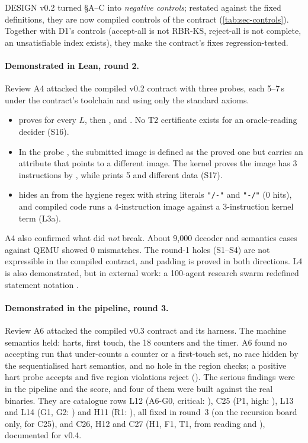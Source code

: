 DESIGN v0.2 turned §A--C into \emph{negative controls}; restated against the fixed definitions, they
are now compiled controls of the contract (\cref{tab:sec-controls}). Together with D1's controls
(accept-all is not RBR-KS, reject-all is not complete, an unsatisfiable index exists), they make the
contract's fixes regression-tested.

\paragraph{Demonstrated in Lean, round 2.} Review A4 attacked the compiled v0.2 contract with three
probes, each 5--7\,s under the contract's toolchain and using only the standard axioms.
\begin{itemize}[nosep]
\item {} proves  for every $L$, then ,
   and . No T2 certificate exists for an
  oracle-reading decider (S16).
\item In the probe , the submitted image is defined as the proved one but
  carries an  attribute that points to a different image. The kernel proves the image has 3 instructions by , while  prints 5
  and different data (S17).
\item {} hides an  from the hygiene regex with string
  literals \texttt{"/-"} and \texttt{"-/"} (0 hits), and compiled code runs a 4-instruction image
  against a 3-instruction kernel term (L3a).
\end{itemize}
A4 also confirmed what did \emph{not} break. About 9{,}000 decoder and semantics cases against QEMU
showed 0 mismatches. The round-1 holes (S1--S4) are not expressible in the compiled contract, and
padding is proved in both directions. L4 is also demonstrated, but in external work: a 100-agent research swarm
redefined statement notation \cite{paglieri2026swarm}.

\paragraph{Demonstrated in the pipeline, round 3.} Review A6 attacked the compiled v0.3 contract and
its harness. The machine semantics held: harts, first touch, the 18 counters and the timer. A6 found
no accepting run that under-counts a counter or a first-touch set, no race hidden by the
sequentialised hart semantics, and no hole in the region checks; a positive hart probe accepts and
five region violations reject (). The serious findings were in the
pipeline and the score, and four of them were built against the real binaries. They are catalogue
rows L12 (A6-G0, critical: ), C25 (P1, high: ),
L13 and L14 (G1, G2: ) and H11 (R1: ), all fixed in round~3 (on the
recursion board only, for C25), and C26, H12 and C27 (H1, F1, T1, from reading 
and ), documented for v0.4.

